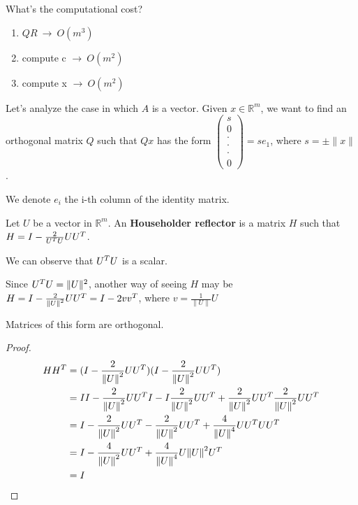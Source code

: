 \documentclass[ComputationalMathematics.tex]{subfiles}
\begin{document}
What's the computational cost?
\begin{enumerate}
  \item $QR ~ \rightarrow ~ O({m}^{3})$
  \item compute c $\rightarrow ~ O({m}^{2})$
  \item compute x $ \rightarrow ~ O({m}^{2})$
\end{enumerate}

Let's analyze the case in which $A$ is a vector. Given $x \in \mathds{R}^m$, we want to find an orthogonal matrix $Q$ such that $Qx$ has the form $\begin{pmatrix}s\\0\\ \cdot\\ \cdot\\ \cdot\\ 0\end{pmatrix} = se_{1}$, where $s= \pm \|x\|$.
  
  We denote $e_{i}$ the i-th column of the identity matrix.

\begin{definition}
  Let $U$ be a vector in $\mathds{R}^m$. An \textbf{Householder reflector} is a matrix $H$ such that $H = I - \frac{2}{{U}^{T}U} U {U}^{T}$.
  
  We can observe that ${U}^{T}U$ is a scalar.

    Since ${U}^{T}U = \|U\|^2$, another way of seeing $H$ may be $H = I - \frac{2}{{\|U\|}^{2}} U {U}^{T} = I - 2v {v}^{T}$, where $v = \frac{1}{\|U\|}U$

  
  \end{definition}
\begin{lemma}
  Matrices of this form are orthogonal.
\end{lemma}

\begin{proof}
  \begin{equation}
    \begin{split}
      H{H}^{T} & = (I-\frac{2}{{\|U\|}^{2}} U {U}^{T}) (I-\frac{2}{{\|U\|}^{2}} U {U}^{T})\\
      & = I I - \frac{2}{{\left\lVert U\right\rVert}^2} U {U}^{T} I-I \frac{2}{{\left\lVert U\right\rVert}^2} U {U}^{T} + \frac{2}{{\left\lVert U\right\rVert}^2} U {U}^{T} \frac{2}{{\left\lVert U\right\rVert}^2} U {U}^{T}\\
      & = I - \frac{2}{{\left\lVert U\right\rVert}^2} U {U}^{T} - \frac{2}{{\left\lVert U\right\rVert}^2} U {U}^{T} + \frac{4}{{\|U\|}^{4}} U{U}^{T} U {U}^{T}\\
      & = I - \frac{4}{{\left\lVert U\right\rVert}^2} U {U}^{T} + \frac{4}{{\|U\|}^{4}} U {\|U\|}^{2} {U}^{T}\\
      & = I
    \end{split}
  \end{equation}
\end{proof}
\end{document}
